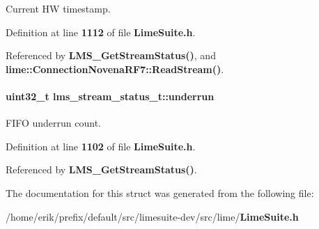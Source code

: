 Current HW timestamp. 



Definition at line {\bf 1112} of file {\bf Lime\+Suite.\+h}.



Referenced by {\bf L\+M\+S\+\_\+\+Get\+Stream\+Status()}, and {\bf lime\+::\+Connection\+Novena\+R\+F7\+::\+Read\+Stream()}.

\paragraph[{underrun}]{\setlength{\rightskip}{0pt plus 5cm}uint32\+\_\+t lms\+\_\+stream\+\_\+status\+\_\+t\+::underrun}\label{structlms__stream__status__t_ad02eb602fc007d3178d52fd75b2ec614}


F\+I\+FO underrun count. 



Definition at line {\bf 1102} of file {\bf Lime\+Suite.\+h}.



Referenced by {\bf L\+M\+S\+\_\+\+Get\+Stream\+Status()}.



The documentation for this struct was generated from the following file\+:\begin{DoxyCompactItemize}
\item 
/home/erik/prefix/default/src/limesuite-\/dev/src/lime/{\bf Lime\+Suite.\+h}\end{DoxyCompactItemize}
